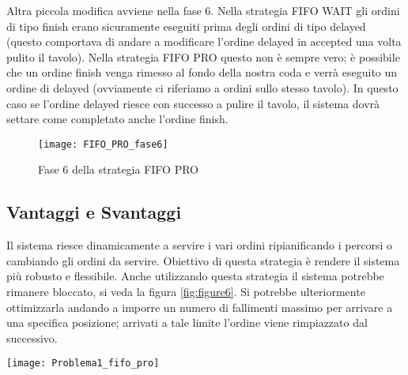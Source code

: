 Altra piccola modifica avviene nella fase 6. Nella strategia FIFO WAIT gli ordini di tipo finish erano sicuramente eseguiti prima degli ordini di tipo delayed (questo comportava di andare a modificare l'ordine delayed in accepted una volta pulito il tavolo). Nella strategia FIFO PRO questo non è sempre vero; è possibile che un ordine finish venga rimesso al fondo della nostra coda e verrà eseguito un ordine di delayed (ovviamente ci riferiamo a ordini sullo stesso tavolo). In questo caso se l'ordine delayed riesce con successo a pulire il tavolo, il sistema dovrà settare come completato anche l'ordine finish.

\begin{figure}[htp]
  \texttt{[image: FIFO\_PRO\_fase6]}
  \caption{Fase 6 della strategia FIFO PRO}
  \label{fig:figure5}
\end{figure}

\subsection{Vantaggi e Svantaggi}
Il sistema riesce dinamicamente a servire i vari ordini ripianificando i percorsi o cambiando gli ordini da servire. Obiettivo di questa strategia è rendere il sistema più robusto e flessibile.
Anche utilizzando questa strategia il sistema potrebbe rimanere bloccato, si veda la figura \ref{fig:figure6}. Si potrebbe ulteriormente ottimizzarla andando a imporre un numero di fallimenti massimo per arrivare a una specifica posizione; arrivati a tale limite l'ordine viene rimpiazzato dal successivo.

\begin{SCfigure}[]
\centering
\texttt{[image: Problema1\_fifo\_pro]}
\caption{In questo esempio il robot vuole arrivare al TD e continuerà a spostarsi dalla cella (9,6) alla (7,4) e viceversa. Ricordiamo che il robot del mondo conosce solo lo stato delle 9 celle adiacenti a lui e le posizioni dei dispenser e dei tavoli. Quando si trova nella cella (7,4) non sa che nella (9,5) c'è una persona e quindi astar pianifica verso quella destinazione.}
\label{fig:figure6}
\end{SCfigure}

